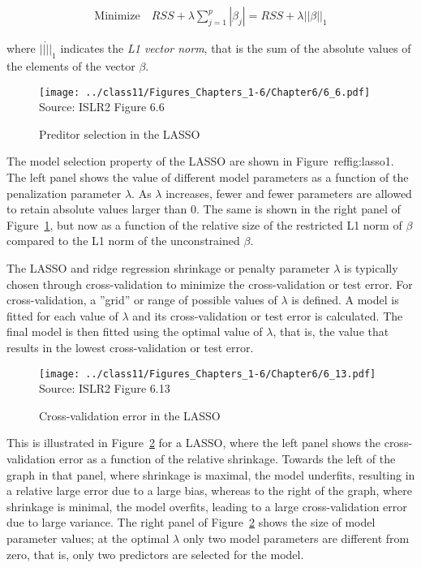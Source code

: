 \begin{align*}
\text{Minimize} \quad RSS + \lambda \sum_{j=1}^p |\beta_j| = RSS + \lambda ||\beta||_1
\end{align*}

\noindent where $||\dot||_1$ indicates the \emph{L1 vector norm}, that is the sum of the absolute values of the elements of the vector $\beta$.

\begin{figure}
\centering
\texttt{[image: ../class11/Figures\_Chapters\_1-6/Chapter6/6\_6.pdf]} \\

\scriptsize Source: ISLR2 Figure 6.6
\caption{Preditor selection in the LASSO}
\label{fig:lasso1}
\end{figure}

The model selection property of the LASSO are shown in Figure~ref{fig:lasso1}. The left panel shows the value of different model parameters as a function of the penalization parameter $\lambda$. As $\lambda$ increases, fewer and fewer parameters are allowed to retain absolute values larger than 0. The same is shown in the right panel of Figure~\ref{fig:lasso1}, but now as a function of the relative size of the restricted L1 norm of $\beta$ compared to the L1 norm of the unconstrained $\beta$.

The LASSO and ridge regression shrinkage or penalty parameter $\lambda$ is typically chosen through cross-validation to minimize the cross-validation or test error. For cross-validation, a ''grid'' or range of possible values of $\lambda$ is defined. A model is fitted for each value of $\lambda$ and its cross-validation or test error is calculated. The final model is then fitted using the optimal value of $\lambda$, that is, the value that results in the lowest cross-validation or test error.

\begin{figure}
\centering
\texttt{[image: ../class11/Figures\_Chapters\_1-6/Chapter6/6\_13.pdf]} \\

\scriptsize Source: ISLR2 Figure 6.13
\caption{Cross-validation error in the LASSO}
\label{fig:lasso2}
\end{figure}

This is illustrated in Figure~\ref{fig:lasso2} for a LASSO, where the left panel shows the cross-validation error as a function of the relative shrinkage. Towards the left of the graph in that panel, where shrinkage is maximal, the model underfits, resulting in a relative large error due to a large bias, whereas to the right of the graph, where shrinkage is minimal, the model overfits, leading to a large cross-validation error due to large variance. The right panel of Figure~\ref{fig:lasso2} shows the size of model parameter values; at the optimal $\lambda$ only two model parameters are different from zero, that is, only two predictors are selected for the model. 

